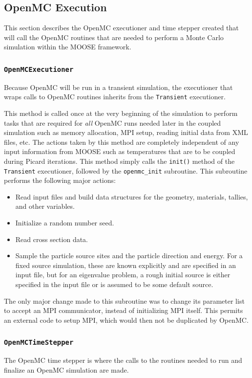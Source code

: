 \documentclass[10pt]{article}
\newcounter{subsubsubsection}[subsubsection]
\numberwithin{equation}{section} %
\begin{document}
\subsection{OpenMC Execution}
This section describes the OpenMC executioner and time stepper created that will call the OpenMC routines that are needed to perform a Monte Carlo simulation within the MOOSE framework. 

\subsubsection{{\tt OpenMCExecutioner}}
Because OpenMC will be run in a transient simulation, the executioner that wraps calls to OpenMC routines inherits from the {\tt Transient} executioner.

This method is called once at the very beginning of the simulation to perform tasks that are required for {\it all} OpenMC runs needed later in the coupled simulation such as memory allocation, MPI setup, reading initial data from XML files, etc. The actions taken by this method are completely independent of any input information from MOOSE such as temperatures that are to be coupled during Picard iterations. This method simply calls the {\tt init()} method of the {\tt Transient} executioner, followed by the {\tt openmc\_init} subroutine. This subroutine performs the following major actions:

\begin{itemize}
\item Read input files and build data structures for the geometry, materials, tallies, and other variables.
\item Initialize a random number seed.
\item Read cross section data.
\item Sample the particle source sites and the particle direction and energy. For a fixed source simulation, these are known explicitly and are specified in an input file, but for an eigenvalue problem, a rough initial source is either specified in the input file or is assumed to be some default source. 
\end{itemize}

The only major change made to this subroutine was to change its parameter list to accept an MPI communicator, instead of initializing MPI itself. This permits an external code to setup MPI, which would then not be duplicated by OpenMC.

\subsubsection{{\tt OpenMCTimeStepper}}
The OpenMC time stepper is where the calls to the routines needed to run and finalize an OpenMC simulation are made.
\end{document}
